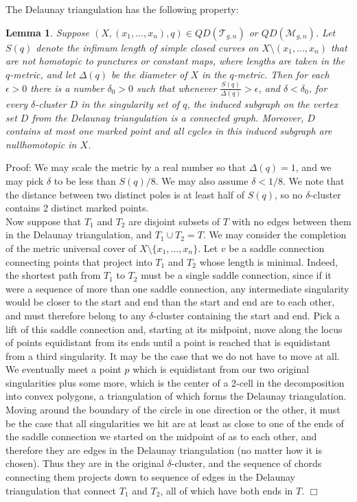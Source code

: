 \documentclass[12pt]{article}
\newtheorem{lemma}[theorem]{Lemma}
\begin{document}
\noindent The Delaunay triangulation has the following property:

\begin{lemma}\label{LemmaClusterSaddles} Suppose $(X,(x_1,...,x_n),q) \in QD(\mathcal{T}_{g,n})$ or $QD(\mathcal{M}_{g,n})$. Let $S(q)$ denote the infimum length of simple closed curves on $X \setminus (x_1,...,x_n)$ that are not homotopic to punctures or constant maps, where lengths are taken in the $q$-metric, and let $\Delta(q)$ be the diameter of $X$ in the $q$-metric. Then for each $\epsilon > 0$ there is a number $\delta_0 > 0$ such that whenever $\frac{S(q)}{\Delta(q)} > \epsilon$, and $\delta < \delta_0$, for every $\delta$-cluster $D$ in the singularity set of $q$, the induced subgraph on the vertex set $D$ from the Delaunay triangulation is a connected graph. Moreover, $D$ contains at most one marked point and all cycles in this induced subgraph are nullhomotopic in $X$.\end{lemma}

\noindent Proof: We may scale the metric by a real number so that $\Delta(q) = 1$, and we may pick $\delta$ to be less than $S(q)/8$. We may also assume $\delta < 1/8.$ We note that the distance between two distinct poles is at least half of $S(q)$, so no $\delta$-cluster contains 2 distinct marked points.\\

\noindent Now suppose that $T_1$ and $T_2$ are disjoint subsets of $T$ with no edges between them in the Delaunay triangulation, and $T_1 \cup T_2  = T$. We may consider the completion of the metric universal cover of $X \setminus \{x_1,...,x_n\}$. Let $v$ be a saddle connection connecting points that project into $T_1$ and $T_2$ whose length is minimal. Indeed, the shortest path from $T_1$ to $T_2$ must be a single saddle connection, since if it were a sequence of more than one saddle connection, any intermediate singularity would be closer to the start and end than the start and end are to each other, and must therefore belong to any $\delta$-cluster containing the start and end. Pick a lift of this saddle connection and, starting at its midpoint, move along the locus of points equidistant from its ends until a point is reached that is equidistant from a third singularity. It may be the case that we do not have to move at all. We eventually meet a point $p$ which is equidistant from our two original singularities plus some more, which is the center of a 2-cell in the decomposition into convex polygons, a triangulation of which forms the Delaunay triangulation. Moving around the boundary of the circle in one direction or the other, it must be the case that all singularities we hit are at least as close to one of the ends of the saddle connection we started on the midpoint of as to each other, and therefore they are edges in the Delaunay triangulation (no matter how it is chosen). Thus they are in the original $\delta$-cluster, and the sequence of chords connecting them projects down to sequence of edges in the Delaunay triangulation that connect $T_1$ and $T_2$, all of which have both ends in $T$. $\Box$
\end{document}
